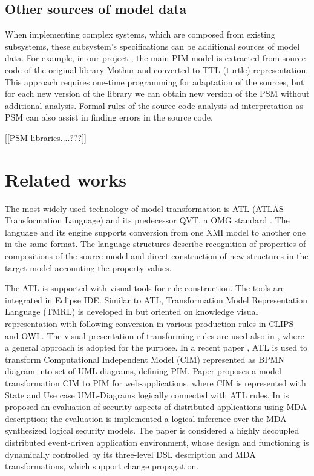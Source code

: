 \documentclass[12pt,a4paper]{llncs}
\begin{document}

\subsection{Other sources of model data}
\label{sec:other-models}

When implementing complex systems, which are composed from existing subsystems, these subsystem's specifications can be additional sources of model data.  For example, in our project \cite{bit2019}, the main PIM model is extracted from source code of the original library Mothur and converted to TTL (turtle) representation.  This approach requires one-time programming for adaptation of the sources, but for each new version of the library we can obtain new version of the PSM without additional analysis.  Formal rules of the source code analysis ad interpretation as PSM can also assist in finding errors in the source code.

[[PSM libraries....???]]


\section{Related works}

The most widely used technology of model transformation is ATL (ATLAS Transformation Language) \cite{atl} and its predecessor QVT, a OMG standard \cite{QVT}.  The language and its engine supports conversion from one XMI model to another one in the same format.  The language structures describe recognition of properties of compositions of the source model and direct construction of new structures in the target model accounting the property values.

The ATL is supported with visual tools for rule construction.  The tools are integrated in Eclipse IDE.  Similar to ATL, Transformation Model Representation Language (TMRL) is developed in \cite{nikita} but oriented on knowledge visual representation with following conversion in various production rules in CLIPS and OWL.  The visual presentation of transforming rules are used also in \cite{GT}, where a general approach is adopted for the purpose.  In a recent paper \cite{azis}, ATL is used to transform Computational Independent Model (CIM) represented as BPMN diagram into set of UML diagrams, defining PIM. Paper \cite{Rhazali} proposes a model transformation CIM to PIM for web-applications, where CIM is represented with State and Use case UML-Diagrams logically connected with ATL rules.  In \cite{Hamid} is proposed an evaluation of security aspects of distributed applications using MDA description; the evaluation is implemented a logical inference over the MDA synthesized logical security models. The paper \cite{Zdun} is considered a highly decoupled distributed event-driven application environment, whose design and functioning is dynamically controlled by its three-level DSL description and MDA transformations, which support change propagation.
\end{document}
